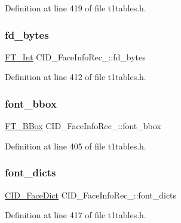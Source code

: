 Definition at line 419 of file t1tables.\+h.

\mbox{\label{struct_c_i_d___face_info_rec___a72944c0b4e85dba619adaf114ff7a8b1}} 
\subsubsection{\texorpdfstring{fd\_bytes}{fd\_bytes}}
{\footnotesize\ttfamily \mbox{\hyperlink{fttypes_8h_af90e5fb0d07e21be9fe6faa33f02484c}{F\+T\+\_\+\+Int}} C\+I\+D\+\_\+\+Face\+Info\+Rec\+\_\+\+::fd\+\_\+bytes}



Definition at line 412 of file t1tables.\+h.

\mbox{\label{struct_c_i_d___face_info_rec___a48fe4e9246535f547241028cbf8d8b41}} 
\subsubsection{\texorpdfstring{font\_bbox}{font\_bbox}}
{\footnotesize\ttfamily \mbox{\hyperlink{ftimage_8h_ae341c4eb5a7199947a13b2a1dcaf7af7}{F\+T\+\_\+\+B\+Box}} C\+I\+D\+\_\+\+Face\+Info\+Rec\+\_\+\+::font\+\_\+bbox}



Definition at line 405 of file t1tables.\+h.

\mbox{\label{struct_c_i_d___face_info_rec___a821a773b846c837338d1c03984e5e7d5}} 
\subsubsection{\texorpdfstring{font\_dicts}{font\_dicts}}
{\footnotesize\ttfamily \mbox{\hyperlink{t1tables_8h_a34b9250866d5498cf916e98d87be861d}{C\+I\+D\+\_\+\+Face\+Dict}} C\+I\+D\+\_\+\+Face\+Info\+Rec\+\_\+\+::font\+\_\+dicts}



Definition at line 417 of file t1tables.\+h.

